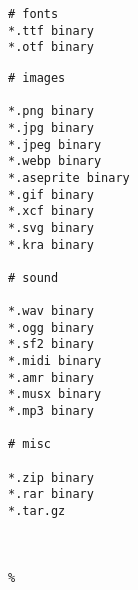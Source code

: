 \begin{itemize}[label=-]
\begin{minipage}{.45\textwidth}
\begin{lstlisting}
# fonts
*.ttf binary
*.otf binary
\end{lstlisting}
\end{minipage}\hfill
\begin{minipage}{.45\textwidth}
\begin{lstlisting}[escapechar=\%]
# images

*.png binary
*.jpg binary
*.jpeg binary
*.webp binary
*.aseprite binary
*.gif binary
*.xcf binary
*.svg binary
*.kra binary

# sound

*.wav binary
*.ogg binary
*.sf2 binary
*.midi binary
*.amr binary
*.musx binary
*.mp3 binary

# misc

*.zip binary
*.rar binary
*.tar.gz



%
\end{lstlisting}
\end{minipage}

\end{itemize}